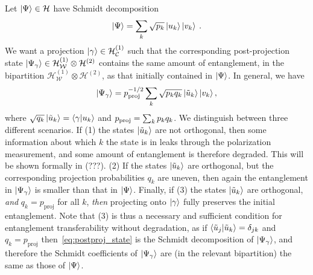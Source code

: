 \documentclass[
	aps, pra,
	superscriptaddress, twocolumn,
	floatfix,
	10pt
]{revtex4-1}
\newcommand{\bs}[1]{\boldsymbol{#1}}
\newcommand{\on}[1]{\operatorname{#1}}
\newcommand{\parTitle}[1]{\noindent{\color{Mahogany}(\emph{#1})}}
\newcommand{\calC}{{\mathcal{C}}}
\newcommand{\calH}{{\mathcal{H}}}
\newcommand{\calW}{{\mathcal{W}}}
\newcommand{\HC}{\calH_\calC}
\newcommand{\HW}{\calH_\calW}
\renewcommand{\parTitle}[1]{}
\begin{document}
\parTitle{Conditions for entanglement transfer}
Let $\ket\Psi\in\calH$ have Schmidt decomposition
\begin{equation}
	\ket\Psi= \sum_k \sqrt{p_k} \ket{u_k}\ket{v_k} \:.
\end{equation}
We want a projection $\ket\gamma\in\HC^{(1)}$ such that the corresponding post-projection state $\ket{\Psi_\gamma}\in\HW^{(1)}\otimes\calH^{(2)}$ contains the same amount of entanglement, in the bipartition $\HW^{(1)}\otimes\calH^{(2)}$, as that initially contained in $\ket\Psi$.
In general, we have
\begin{equation}
    \ket{\Psi_\gamma} = p_{\rm proj}^{-1/2}
    \sum_k \sqrt{p_k q_k} \ket{\tilde u_k}\ket{v_k},
    \label{eq:postproj_state}
\end{equation}
where
$\sqrt{q_k}\ket{\tilde u_k}= \braket\gamma{u_k}$
and
$p_{\rm proj} = \sum_k p_k q_k$.
We distinguish between three different scenarios.
If (1) the states $\ket{\tilde u_k}$ are not orthogonal, then some information about which $k$ the state is in leaks through the polarization measurement, and some amount of entanglement is therefore degraded. This will be shown formally in (???).
(2) If the states $\ket{\tilde u_k}$ are orthogonal, but the corresponding projection probabilities $q_k$ are uneven, then again the entanglement in $\ket{\Psi_\gamma}$ is smaller than that in $\ket\Psi$.
Finally, if (3) the states $\ket{\tilde u_k}$ are orthogonal, \emph{and} $q_k=p_{\on{proj}}$ for all $k$, \textit{then} projecting onto $\ket\gamma$ fully preserves the initial entanglement.
Note that (3) is thus a necessary and sufficient condition for entanglement transferability without degradation,
as if $\braket{\tilde u_j}{\tilde u_k}=\delta_{jk}$ and $q_k=p_{\on{proj}}$ then~\cref{eq:postproj_state} is the Schmidt decomposition of $\ket{\Psi_\gamma}$, and therefore the Schmidt coefficients of $\ket{\Psi_\gamma}$ are (in the relevant bipartition) the same as those of $\ket{\Psi}$.
\end{document}

